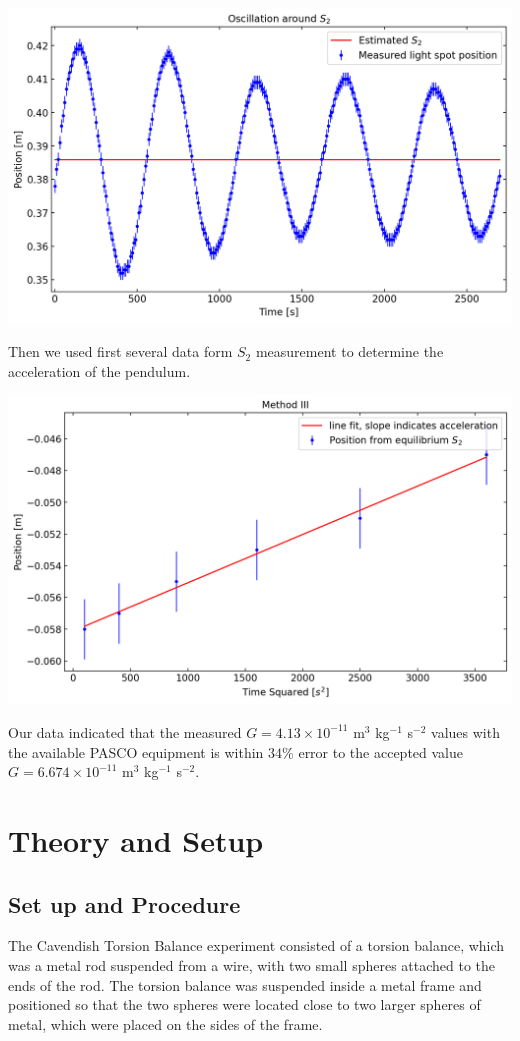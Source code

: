 \documentclass[a4paper]{tufte-handout}
\begin{document}
\includegraphics[width= 1 \linewidth]{figures/eq_s2.png}

Then we used first several data form $S_2$ measurement to determine the acceleration of the pendulum. 

\includegraphics[width= 1 \linewidth]{figures/fit_m3.png}

Our data indicated that the measured $G = 4.13 \times 10^{-11}$ m$^3$ kg$^{-1}$ s$^{-2}$ values with the available PASCO equipment is within $34\%$ error to the accepted value $G = 6.674 \times 10^{-11} $ m$^3$ kg$^{-1}$ s$^{-2}$.

\newpage
\section{Theory and Setup}

\subsection{Set up and Procedure}
The Cavendish Torsion Balance experiment consisted of a torsion balance, which was a metal rod suspended from a wire, with two small spheres attached to the ends of the rod. The torsion balance was suspended inside a metal frame and positioned so that the two spheres were located close to two larger spheres of metal, which were placed on the sides of the frame. 
\end{document}
